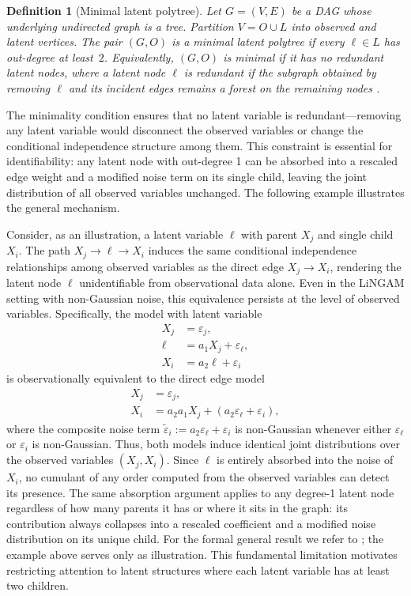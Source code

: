 \documentclass[11pt,a4paper]{article}
\numberwithin{equation}{section}
\newtheorem{definition}[theorem]{Definition}
\begin{document}
\begin{definition}[Minimal latent polytree]\label{def:minimal_polytree}
Let $G=(V,E)$ be a DAG whose underlying undirected graph is a tree. Partition $V=O\cup L$ into observed and latent vertices. The pair $(G,O)$ is a \emph{minimal latent polytree} if every $\ell\in L$ has out-degree at least~$2$. Equivalently, $(G,O)$ is minimal if it has no \emph{redundant} latent nodes, where a latent node $\ell$ is redundant if the subgraph obtained by removing $\ell$ and its incident edges remains a forest on the remaining nodes \citep{etesami:kiyavash:coleman:2016}.
\end{definition}

The minimality condition ensures that no latent variable is redundant—removing any latent variable would disconnect the observed variables or change the conditional independence structure among them. This constraint is essential for identifiability: any latent node with out-degree 1 can be absorbed into a rescaled edge weight and a modified noise term on its single child, leaving the joint distribution of all observed variables unchanged. The following example illustrates the general mechanism.

Consider, as an illustration, a latent variable $\ell$ with parent $X_j$ and single child $X_i$. The path $X_j \to \ell \to X_i$ induces the same conditional independence relationships among observed variables as the direct edge $X_j \to X_i$, rendering the latent node $\ell$ unidentifiable from observational data alone. Even in the LiNGAM setting with non-Gaussian noise, this equivalence persists at the level of observed variables. Specifically, the model with latent variable
\begin{align*}
X_j &= \varepsilon_j, \\
\ell &= a_1 X_j + \varepsilon_\ell, \\
X_i &= a_2 \ell + \varepsilon_i
\end{align*}
is observationally equivalent to the direct edge model
\begin{align*}
X_j &= \varepsilon_j, \\
X_i &= a_2 a_1 X_j + (a_2 \varepsilon_\ell + \varepsilon_i),
\end{align*}
where the composite noise term $\tilde{\varepsilon}_i := a_2 \varepsilon_\ell + \varepsilon_i$ is non-Gaussian whenever either $\varepsilon_\ell$ or $\varepsilon_i$ is non-Gaussian. Thus, both models induce identical joint distributions over the observed variables $(X_j, X_i)$. Since $\ell$ is entirely absorbed into the noise of $X_i$, no cumulant of any order computed from the observed variables can detect its presence. The same absorption argument applies to any degree-1 latent node regardless of how many parents it has or where it sits in the graph: its contribution always collapses into a rescaled coefficient and a modified noise distribution on its unique child. For the formal general result we refer to \citet{etesami:kiyavash:coleman:2016}; the example above serves only as illustration. This fundamental limitation motivates restricting attention to latent structures where each latent variable has at least two children.
\end{document}
